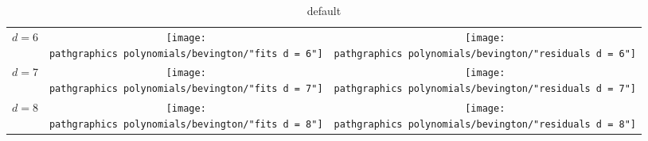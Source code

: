 \begin{table}[t]
	\begin{center}
		\begin{tabular}{lcc}
		  $d=6$ & \raisebox{-0.575\height}{\texttt{[image: \\pathgraphics polynomials/bevington/"fits d = 6"]}}
		        & \raisebox{-0.575\height}{\texttt{[image: \\pathgraphics polynomials/bevington/"residuals d = 6"]}} \\[80pt]
		  $d=7$ & \raisebox{-0.575\height}{\texttt{[image: \\pathgraphics polynomials/bevington/"fits d = 7"]}}
		        & \raisebox{-0.575\height}{\texttt{[image: \\pathgraphics polynomials/bevington/"residuals d = 7"]}} \\[80pt]
		  $d=8$ & \raisebox{-0.575\height}{\texttt{[image: \\pathgraphics polynomials/bevington/"fits d = 8"]}}
		        & \raisebox{-0.575\height}{\texttt{[image: \\pathgraphics polynomials/bevington/"residuals d = 8"]}} \\[80pt]
		\end{tabular}
	\end{center}
	\caption{default}
\end{table}%

\endinput  %

